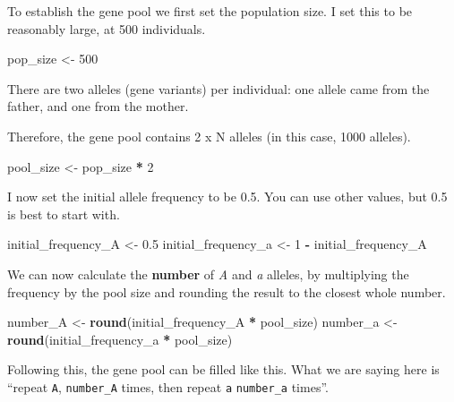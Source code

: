 \documentclass[
  a4paper]{book}
\newenvironment{Shaded}{\begin{snugshade}}{\end{snugshade}}
\newcommand{\DecValTok}[1]{\textcolor[rgb]{0.00,0.00,0.81}{#1}}
\newcommand{\FloatTok}[1]{\textcolor[rgb]{0.00,0.00,0.81}{#1}}
\newcommand{\FunctionTok}[1]{\textcolor[rgb]{0.13,0.29,0.53}{\textbf{#1}}}
\newcommand{\NormalTok}[1]{#1}
\newcommand{\OtherTok}[1]{\textcolor[rgb]{0.56,0.35,0.01}{#1}}
\newcommand{\SpecialCharTok}[1]{\textcolor[rgb]{0.81,0.36,0.00}{\textbf{#1}}}
\begin{document}
To establish the gene pool we first set the population size. I set this to be reasonably large, at 500 individuals.

\begin{Shaded}
\begin{Highlighting}[]
\NormalTok{pop\_size }\OtherTok{\textless{}{-}} \DecValTok{500}
\end{Highlighting}
\end{Shaded}

There are two alleles (gene variants) per individual: one allele came from the father, and one from the mother.

Therefore, the gene pool contains 2 x N alleles (in this case, 1000 alleles).

\begin{Shaded}
\begin{Highlighting}[]
\NormalTok{pool\_size }\OtherTok{\textless{}{-}}\NormalTok{ pop\_size }\SpecialCharTok{*} \DecValTok{2}
\end{Highlighting}
\end{Shaded}

I now set the initial allele frequency to be 0.5. You can use other values, but 0.5 is best to start with.

\begin{Shaded}
\begin{Highlighting}[]
\NormalTok{initial\_frequency\_A }\OtherTok{\textless{}{-}} \FloatTok{0.5}
\NormalTok{initial\_frequency\_a }\OtherTok{\textless{}{-}} \DecValTok{1} \SpecialCharTok{{-}}\NormalTok{ initial\_frequency\_A}
\end{Highlighting}
\end{Shaded}

We can now calculate the \textbf{number} of \emph{A} and \emph{a} alleles, by multiplying the frequency by the pool size and rounding the result to the closest whole number.

\begin{Shaded}
\begin{Highlighting}[]
\NormalTok{number\_A }\OtherTok{\textless{}{-}} \FunctionTok{round}\NormalTok{(initial\_frequency\_A }\SpecialCharTok{*}\NormalTok{ pool\_size)}
\NormalTok{number\_a }\OtherTok{\textless{}{-}} \FunctionTok{round}\NormalTok{(initial\_frequency\_a }\SpecialCharTok{*}\NormalTok{ pool\_size)}
\end{Highlighting}
\end{Shaded}

Following this, the gene pool can be filled like this.
What we are saying here is ``repeat \texttt{A}, \texttt{number\_A} times, then repeat \texttt{a} \texttt{number\_a} times''.
\end{document}
